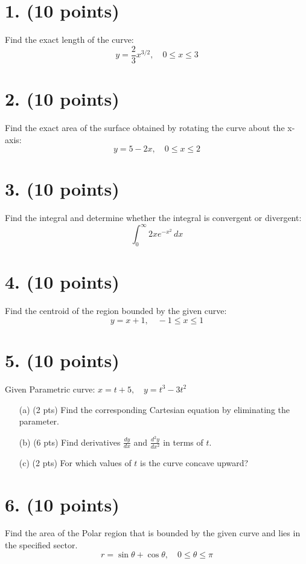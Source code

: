\section*{1. (10 points)}
Find the exact length of the curve: \\
\[
y = \frac{2}{3}x^{3/2}, \quad 0 \leq x \leq 3
\]

\section*{2. (10 points)}
Find the exact area of the surface obtained by rotating the curve about the x-axis: \\
\[
y = 5 - 2x, \quad 0 \leq x \leq 2
\]

\section*{3. (10 points)}
Find the integral and determine whether the integral is convergent or divergent: \\
\[
\int_0^{\infty} 2x e^{-x^2} \, dx
\]

\section*{4. (10 points)}
Find the centroid of the region bounded by the given curve: \\
\[
y = x + 1, \quad -1 \leq x \leq 1
\]

\section*{5. (10 points)}
Given Parametric curve: \( x = t + 5, \quad y = t^3 - 3t^2 \)
\begin{enumerate}
    \item[(a)] (2 pts) Find the corresponding Cartesian equation by eliminating the parameter.
    \item[(b)] (6 pts) Find derivatives \( \frac{dy}{dx} \) and \( \frac{d^2y}{dx^2} \) in terms of \( t \). \\
    [Hint: \( \frac{dy}{dx} = \frac{dy/dt}{dx/dt} \), and \( \frac{d^2y}{dx^2} = \frac{d(dy/dx)/dt}{dx/dt} \)]
    \item[(c)] (2 pts) For which values of \( t \) is the curve concave upward?
\end{enumerate}

\section*{6. (10 points)}
Find the area of the Polar region that is bounded by the given curve and lies in the specified sector. \\
[Hint: \( \sin 2\theta = 2\sin \theta \cos \theta \)]
\[
r = \sin \theta + \cos \theta, \quad 0 \leq \theta \leq \pi
\]


